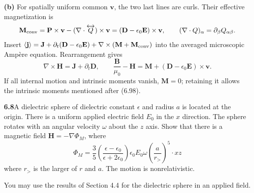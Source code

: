 \textbf{(b)} For spatially uniform common $\mathbf v$, the two last lines
are curls. Their effective magnetization is
\[
\mathbf M_{\rm conv}=\mathbf P\times\mathbf v
-(\nabla\cdot\overleftrightarrow Q)\times\mathbf v
=(\mathbf D-\epsilon_0\mathbf E)\times\mathbf v,
\qquad (\nabla\cdot Q)_\alpha=\partial_\beta Q_{\alpha\beta}.
\]
Insert $\langle\mathbf j\rangle=\mathbf J+\partial_t(\mathbf D-\epsilon_0\mathbf E)
+\nabla\times(\mathbf M+\mathbf M_{\rm conv})$ into the averaged microscopic
Amp\`ere equation. Rearrangement gives
\[
\nabla\times\mathbf H=\mathbf J+\partial_t\mathbf D,\qquad
\boxed{\frac{\mathbf B}{\mu_0}-\mathbf H
=\mathbf M+(\mathbf D-\epsilon_0\mathbf E)\times\mathbf v}.
\]
If all internal motion and intrinsic moments vanish, $\mathbf M=0$;
retaining it allows the intrinsic moments mentioned after (6.98).

\par\bigskip
\noindent\textbf{6.8}\quad A dielectric sphere of dielectric constant $\epsilon$ and radius $a$ is located at the origin. There is a uniform applied electric field $E_{0}$ in the $x$ direction. The sphere rotates with an angular velocity $\omega$ about the $z$ axis. Show that there is a magnetic field $\mathbf{H}=-\nabla\Phi_{M}$, where
\[
\Phi_{M}=\frac{3}{5}\left(\frac{\epsilon-\epsilon_{0}}{\epsilon+2\epsilon_{0}}\right)\!\epsilon_{0}E_{0}\omega\!\left(\frac{a}{r_{>}}\right)^{5}\cdot xz
\]
where $r_{>}$ is the larger of $r$ and $a$. The motion is nonrelativistic.

You may use the results of Section 4.4 for the dielectric sphere in an applied field.
\solution

